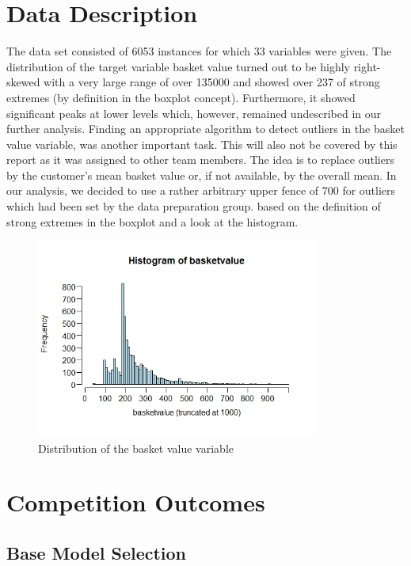\section{Data Description}

The data set consisted of 6053 instances for which 33 variables were given. The distribution of the target variable basket value turned out to be highly right-skewed with a very large range  of over 135000 and showed over 237 of strong extremes (by definition in the boxplot concept). Furthermore, it showed significant peaks at lower levels which, however, remained undescribed in our further analysis. Finding an appropriate algorithm to detect outliers in the basket value variable, was another important task. This will also not be covered by this report as it was assigned to other team members.  The idea is to replace outliers by the customer's mean basket value or, if not available, by the overall mean. In our analysis, we decided to use a rather arbitrary upper fence of 700 for outliers which had been set by the data preparation group. based on the definition of strong extremes in the boxplot and a look at the histogram.

\begin{figure}[H]
\centering
\includegraphics[width=0.83\textwidth]{histbasket.jpeg}
\caption{Distribution of the basket value variable}
\end{figure}

\section{Competition Outcomes}

\subsection{Base Model Selection}


